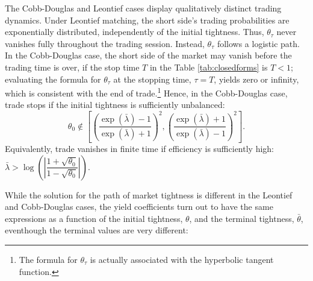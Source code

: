 \documentclass[12pt,american,english,notitlepage]{article}
\begin{document}
The Cobb-Douglas and Leontief cases display qualitatively distinct trading dynamics. Under Leontief matching, the short side's trading probabilities are exponentially distributed, independently of the initial tightness. Thus, $\theta_{\tau}$ never vanishes fully throughout the trading session. Instead, $\theta_{\tau}$ follows a logistic path. In the Cobb-Douglas case, the short side of the market may vanish before the trading time is over, if the stop time $T$ in the
Table \ref{tab:closedforms} is $T<1$; evaluating the formula for $\theta_{\tau}$ at the stopping
time, $\tau=T$, yields zero or infinity, which is consistent with
the end of trade.\footnote{The formula for $\theta_{\tau}$ is actually associated with the hyperbolic
tangent function.} Hence, in the Cobb-Douglas case, trade stops if
the initial tightness is sufficiently unbalanced:
\[
\theta_{0}\not\in\left[\left(\frac{\exp\left(\bar{\lambda}\right)-1}{\exp\left(\bar{\lambda}\right)+1}\right)^{2},\left(\frac{\exp\left(\bar{\lambda}\right)+1}{\exp\left(\bar{\lambda}\right)-1}\right)^{2}\right].
\]
Equivalently, trade vanishes in finite time if efficiency is sufficiently high: $\bar{\lambda}>\log\left(\left|\dfrac{1+\sqrt{\theta_{0}}}{1-\sqrt{\theta_{0}}}\right|\right)$. 

While the solution for the path of market tightness is different in the Leontief
and Cobb-Douglas cases, the yield coefficients turn out to have the same expressions
as a function of the initial tightness, $\theta$, and the terminal tightness, $\bar{\theta}$, eventhough the terminal values are very different:
\end{document}
